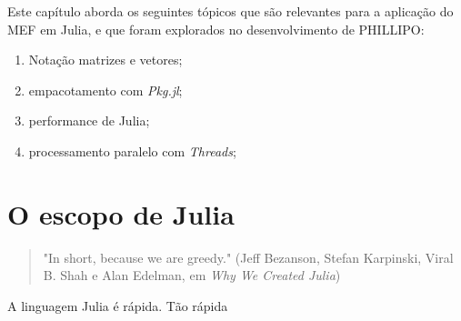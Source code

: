 Este capítulo aborda os seguintes tópicos  que são relevantes para a aplicação do MEF em Julia, e que foram explorados no desenvolvimento de PHILLIPO:

\begin{enumerate}
    \item Notação matrizes e vetores;
    \item empacotamento com \emph{Pkg.jl};
    \item performance de Julia;
    \item processamento paralelo com \emph{Threads};
\end{enumerate}

\section{O escopo de Julia}

\begin{quotation}
    "In short, because we are greedy."
    (Jeff Bezanson, Stefan Karpinski, Viral B. Shah e Alan Edelman, em \emph{Why We Created Julia})
\end{quotation}

A linguagem Julia é rápida. Tão rápida \cite{julia}